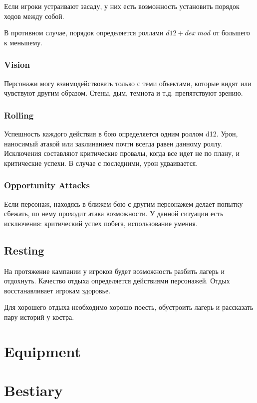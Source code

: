 \documentclass[a5paper,11pt]{book}
\begin{document}
\begin{multicols}{2}
Если игроки устраивают засаду, у них есть возможность установить порядок ходов между собой.

В противном случае, порядок определяется роллами \(d12 + dex\ mod\) от большего к меньшему.

\subsection{Vision}

Персонажи могу взаимодействовать только с теми объектами, которые видят или чувствуют другим образом. Стены, дым, темнота и т.д. препятствуют зрению.

\subsection{Rolling}

Успешность каждого действия в бою определяется одним роллом d12. Урон, наносимый атакой или заклинанием почти всегда равен данному роллу. Исключения составляют критические провалы, когда все идет не по плану, и критические успехи. В случае с последними, урон удваивается.

\subsection{Opportunity Attacks}

Если персонаж, находясь в ближем бою с другим персонажем делает попытку сбежать, по нему проходит атака возможности. У данной ситуации есть исключения: критический успех побега, использование умения.


\section{Resting}

На протяжение кампании у игроков будет возможность разбить лагерь и отдохнуть. Качество отдыха определяется действиями персонажей. Отдых восстанавливает игрокам здоровье.

Для хорошего отдыха необходимо хорошо поесть, обустроить лагерь и рассказать пару историй у костра.

\chapter{Equipment}

\chapter{Bestiary}



\end{multicols}
\end{document}
